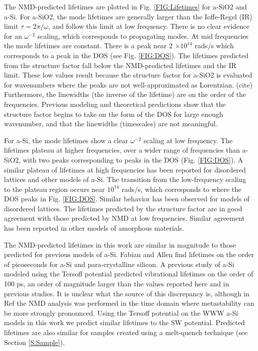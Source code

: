\documentclass[aps,prb,onecolumn,preprint,superscriptaddress,footinbib,amsmath,amssymb,floatfix]{revtex4}
\begin{document}
The NMD-predicted lifetimes are plotted in Fig. \ref{FIG:Lifetimes} 
for a-SiO2 and a-Si. 
For a-SiO2, the mode lifetimes are generally larger than 
the Ioffe-Regel (IR) limit $\tau = 2\pi/\omega$,
\cite{taraskin_determination_1999} and follow 
this limit at low frequency. There is no clear evidence for an 
$\omega^{-2}$ scaling, which corresponds to propagating modes.  
At mid frequencies the mode lifetimes are constant. 
There is a peak near 2 $\times 10^{14}$ rads$/$s which corresponds to 
a peak in the DOS (see Fig. \ref{FIG:DOS}). 
The lifetimes predicted from the 
structure factor fall below the NMD-predicted lifetimes 
and the IR limit. These low values result because the structure factor for 
a-SiO2 is evaluated for wavenumbers where the 
peaks are not well-approximated as Lorentzian.
(cite) 
Furthermore, the linewidths (the inverse of the lifetime) are 
on the order of the frequencies. 
Previous modeling and theoretical predictions show that the 
structure factor begins to take on the form of the DOS 
for large enough wavenumber,
\cite{martin-mayor_dynamical_2001,baldi_thermal_2008} and that the 
linewidths (timescales) are not meaningful.

For a-Si, the mode lifetimes show a clear $\omega^{-2}$ 
scaling at low frequency. 
The lifetimes plateau at higher frequencies,
over a wider range of frequencies than a-SiO2, with two peaks 
corresponding to peaks in the DOS (Fig. \ref{FIG:DOS}). A similar 
plateau of lifetimes at high frequencies has been 
reported for disordered lattices
\cite{sheng_heat_1991,larkin_predicting_2013} and 
other models of a-Si.\cite{he_heat_2011} 
The transition from the low-frequency scaling to 
the plateau region occurs near 
$10^{14}$ rads$/$s, which corresponds to where the DOS peaks in Fig. 
\ref{FIG:DOS}. 
Similar behavior has been observed for models of disordered lattices.
\cite{larkin_predicting_2013} The lifetimes predicted by the 
structure factor are in good agreement with those predicted by NMD 
at low frequencies. Similar agreement has been reported in other 
models of amorphous materials.
\cite{mazzacurati_low-frequency_1996} 

The NMD-predicted lifetimes in this work are similar in magnitude to 
those predicted for previous models of a-Si.
\cite{bickham_calculation_1998,fabian_anharmonic_1996,
bickham_numerical_1999,fabian_numerical_2003} 
Fabian and Allen find lifetimes on the order of picoseconds for a-Si
\cite{fabian_anharmonic_1996} and para-crystalline silicon.
\cite{fabian_numerical_2003} 
A previous study of a-Si modeled using the Tersoff potential 
predicted vibrational lifetimes on 
the order of 100 ps, an order of magnitude larger than the values 
reported here and in previous studies.
\cite{bickham_calculation_1998,fabian_anharmonic_1996,
bickham_numerical_1999,fabian_numerical_2003} 
It is unclear what the source of this 
discrepancy is, although in Ref  
the NMD analysis was performed in the time domain where metastability 
can be more strongly pronounced. Using the Tersoff potential on the 
WWW a-Si models in this work we predict similar lifetimes to the 
SW potential. 
Predicted lifetimes are also similar for 
samples created using a melt-quench technique 
(see Section \ref{S:Sample}).
\end{document}
